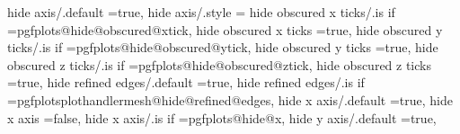 hide axis/.default                                                 =true,                                                                                                                              
hide axis/.style                                                   ={                                                                                                                                 
hide obscured x ticks/.is if                                       =pgfplots@hide@obscured@xtick,                                                                                                      
hide obscured x ticks                                              =true,                                                                                                                              
hide obscured y ticks/.is if                                       =pgfplots@hide@obscured@ytick,                                                                                                      
hide obscured y ticks                                              =true,                                                                                                                              
hide obscured z ticks/.is if                                       =pgfplots@hide@obscured@ztick,                                                                                                      
hide obscured z ticks                                              =true,                                                                                                                              
hide refined edges/.default                                        =true,                                                                                                                              
hide refined edges/.is if                                          =pgfplotsplothandlermesh@hide@refined@edges,                                                                                        
hide x axis/.default                                               =true,                                                                                                                              
hide x axis                                                        =false,                                                                                                                             
hide x axis/.is if                                                 =pgfplots@hide@x,                                                                                                                   
hide y axis/.default                                               =true,                                                                                                                              
}
